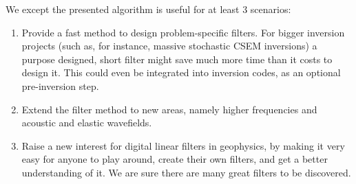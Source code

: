 \documentclass[paper,twocolumn,twoside]{geophysics}
\begin{document}
We except the presented algorithm is useful for at least 3 scenarios:
\begin{enumerate}
  \item Provide a fast method to design problem-specific filters. For bigger
    inversion projects (such as, for instance, massive stochastic CSEM
    inversions) a purpose designed, short filter might save much more time than
    it costs to design it. This could even be integrated into inversion codes,
    as an optional pre-inversion step.
  \item Extend the filter method to new areas, namely higher frequencies and
    acoustic and elastic wavefields.
  \item Raise a new interest for digital linear filters in geophysics, by
    making it very easy for anyone to play around, create their own filters,
    and get a better understanding of it. We are sure there are many great
    filters to be discovered.
\end{enumerate}
~
\end{document}
